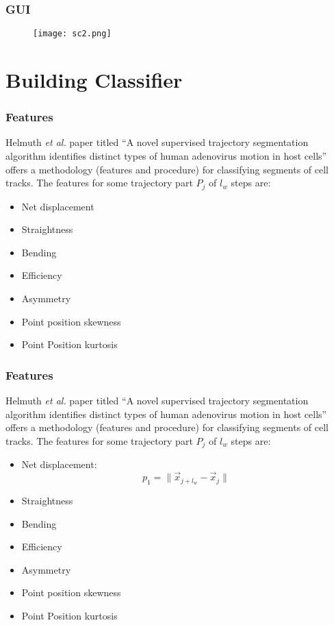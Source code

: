 \documentclass[8pt]{beamer}
\begin{document}
\begin{frame}
  \frametitle{GUI}  
  
    \begin{figure}[H]\centering
    \texttt{[image: sc2.png]}
  \end{figure}
  
\end{frame}


\section{Building Classifier}


\begin{frame}
  \frametitle{Features}
  Helmuth \emph{et al.} paper titled ``A novel supervised trajectory
  segmentation algorithm identifies distinct types of human adenovirus
  motion in host cells'' offers a methodology (features and procedure)
  for classifying segments of cell tracks.
  The features for some trajectory part $P_j$ of $l_w$ steps are:
  \begin{itemize}
  \item Net displacement
  \item Straightness
  \item Bending
  \item Efficiency
  \item Asymmetry
  \item Point position skewness
  \item Point Position kurtosis
  \end{itemize}
\end{frame}

\begin{frame}
  \frametitle{Features}
  Helmuth \emph{et al.} paper titled ``A novel supervised trajectory
  segmentation algorithm identifies distinct types of human adenovirus
  motion in host cells'' offers a methodology (features and procedure)
  for classifying segments of cell tracks.
  The features for some trajectory part $P_j$ of $l_w$ steps are:
  \begin{itemize}
  \item Net displacement: 
    \begin{equation*}
      p_1 = \| \vec{x}_{j+l_w} - \vec{x}_j \|
    \end{equation*}
  \item Straightness
  \item Bending
  \item Efficiency
  \item Asymmetry
  \item Point position skewness
  \item Point Position kurtosis
  \end{itemize}
\end{frame}
\end{document}
